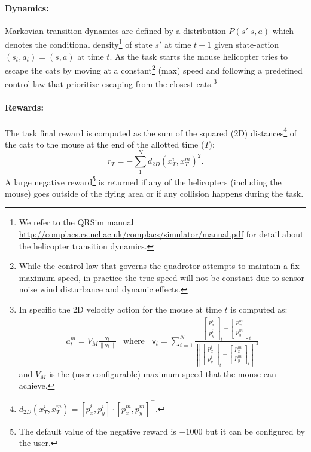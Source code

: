 \documentclass[a4paper,11pt]{report}
\newcommand{\sname}{QRSim\xspace}
\newcommand{\webman}{\url{http://complacs.cs.ucl.ac.uk/complacs/simulator/manual.pdf}\xspace}
\begin{document}
\paragraph{Dynamics:} 
Markovian transition dynamics are defined by a distribution $P(s'|s,a)$ which denotes the conditional density\footnote{We refer to the \sname manual \webman for detail about the helicopter transition dynamics.} of state $s'$ at time $t+1$ given state-action $(s_t,a_t)=(s,a)$ at
time $t$. As the task starts the mouse helicopter tries to escape the cats by moving at a constant\footnote{While the control law that governs the quadrotor attempts to maintain a fix maximum speed, in practice the true speed will not be constant due to sensor noise wind disturbance and dynamic effects.} (max) speed and following a predefined control law that prioritize escaping from the closest cats.\footnote{In specific the 2D velocity action for the mouse at time $t$ is computed as:
$$
\begin{array}{ll}
a^m_t = V_{M} \frac{\mathsf{v}_t}{\| \mathsf{v}_t \|} &
\text{where } \;\;\mathsf{v}_t = \sum_{i=1}^N \frac{\left[\begin{array}{c} p^i_x \\ p^i_y \end{array}\right]_t - \left[\begin{array}{c} p^m_x \\ p^m_y \end{array}\right]_t}{\left\| \left[\begin{array}{c} p^i_x \\ p^i_y \end{array}\right]_t - \left[\begin{array}{c} p^m_x \\ p^m_y \end{array}\right]_t \right\|^2}
\end{array}
$$
and $V_{M}$ is the (user-configurable) maximum speed that the mouse can achieve.  
}

\paragraph{Rewards:}
The task final reward is computed as the sum of the squared (2D) distances\footnote{$d_{2D}(x^i_T,x^m_T) = [p^i_x,p^i_y]\cdot[p^m_x,p^m_y]^\intercal$.} of the cats to the mouse at the end of the allotted time ($T$):
$$r_T = - \sum^N_1 d_{2D}(x^i_T,x^m_T)^2.$$
A large negative reward\footnote{The default value of the negative reward is $-1000$ but it can be configured by the user.} is returned if any of the helicopters (including the mouse) goes outside of the flying area or if any collision happens during the task.
\end{document}
